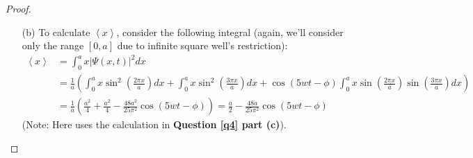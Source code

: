 \documentclass{article}
\begin{document}
\begin{proof}
\begin{itemize}
        \item[(b)] To calculate $\left<x\right>$, consider the following integral (again, we'll consider only the range $[0,a]$ due to infinite square well's restriction):
        \begin{align}
            \left<x\right>&=\int_{0}^{a}x|\Psi(x,t)|^2dx\\
            &= \frac{1}{a}\left(\int_{0}^{a}x\sin^2\left(\frac{2\pi x}{a}\right)dx+\int_{0}^{a}x\sin^2\left(\frac{3\pi x}{a}\right)dx + \cos(5wt-\phi)\int_{0}^{a}x\sin\left(\frac{2\pi x}{a}\right)\sin\left(\frac{3\pi x}{a}\right)dx\right)\\
            &= \frac{1}{a}\left(\frac{a^2}{4}+\frac{a^2}{4}-\frac{48a^2}{25\pi^2}\cos(5wt-\phi)\right) = \frac{a}{2}-\frac{48a}{25\pi^2}\cos(5wt-\phi)
        \end{align}
        (Note: Here uses the calculation in \textbf{Question \ref{q4} part (c)}).


\end{itemize}
\end{proof}
\end{document}
